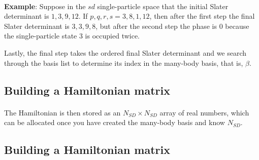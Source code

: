 \documentclass[%
oneside,                 %
final,                   %
10pt]{article}
\begin{document}
\paragraph{}

\textbf{Example}: Suppose in the $sd$ single-particle space that the initial 
Slater determinant
is $1,3,9,12$. If $p,q,r,s = 3,8,1,12$, then after the first step the 
final  Slater determinant
is $3,3,9,8$, but after the second step the phase is 0 
because the single-particle state 3 is
occupied twice.

Lastly, the final step  takes the ordered final Slater determinant and 
we search through the basis list to
determine its index in the many-body basis, that is, $\beta$.



\subsection*{Building a Hamiltonian matrix}

\paragraph{}

The Hamiltonian is then stored as an $N_{SD} \times N_{SD}$ array of real numbers, which
can be allocated once you have created the many-body basis and know $N_{SD}$.



\subsection*{Building a Hamiltonian matrix}

\paragraph{}
\end{document}
